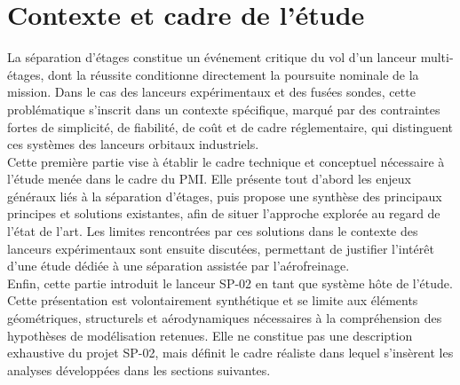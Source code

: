\section{Contexte et cadre de l'étude}
\label{sec:context}

La séparation d’étages constitue un événement critique du vol d’un lanceur multi-étages, dont la réussite conditionne directement
la poursuite nominale de la mission. Dans le cas des lanceurs expérimentaux et des fusées sondes, cette problématique s’inscrit
dans un contexte spécifique, marqué par des contraintes fortes de simplicité, de fiabilité, de coût et de cadre réglementaire,
qui distinguent ces systèmes des lanceurs orbitaux industriels.\\

Cette première partie vise à établir le cadre technique et conceptuel nécessaire à l’étude menée dans le cadre du PMI. Elle
présente tout d’abord les enjeux généraux liés à la séparation d’étages, puis propose une synthèse des principaux principes et
solutions existantes, afin de situer l’approche explorée au regard de l’état de l’art. Les limites rencontrées par ces solutions
dans le contexte des lanceurs expérimentaux sont ensuite discutées, permettant de justifier l’intérêt d’une étude dédiée à une
séparation assistée par l’aérofreinage.\\

Enfin, cette partie introduit le lanceur SP-02 en tant que système hôte de l’étude. Cette présentation est volontairement
synthétique et se limite aux éléments géométriques, structurels et aérodynamiques nécessaires à la compréhension des hypothèses
de modélisation retenues. Elle ne constitue pas une description exhaustive du projet SP-02, mais définit le cadre réaliste dans
lequel s’insèrent les analyses développées dans les sections suivantes.





